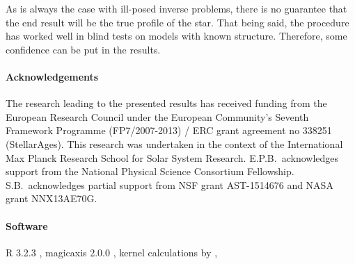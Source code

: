 As is always the case with ill-posed inverse problems, there is no guarantee that the end result will be the true profile of the star. 
That being said, the procedure has worked well in blind tests on models with known structure. 
Therefore, some confidence can be put in the results. 


\paragraph*{Acknowledgements} 
\noindent The research leading to the presented results has received funding from the European Research Council under the European Community's Seventh Framework Programme (FP7/2007-2013) / ERC grant agreement no 338251 (StellarAges). This research was undertaken in the context of the International Max Planck Research School for Solar System Research. E.P.B.\ acknowledges support from the National Physical Science Consortium Fellowship. S.B.\ acknowledges partial support from NSF grant AST-1514676 and NASA grant NNX13AE70G.  

\paragraph*{Software} 
\noindent R 3.2.3 \citep{R}, magicaxis 2.0.0 \citep{magicaxis2}, 
kernel calculations by \citet{kerexact},  

